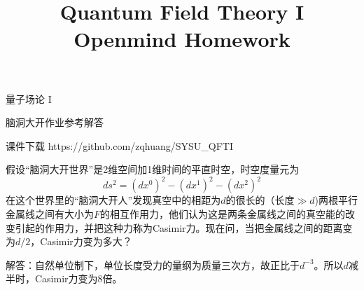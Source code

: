 \documentclass[CJK]{beamer}
\title{Quantum Field Theory I \\ Openmind Homework}
\author{}
\date{}
\begin{document}
\begin{frame}
 
\begin{center}
\begin{Large}
\bch
量子场论 I 

{\vskip 0.3in}

脑洞大开作业参考解答

\ech
\end{Large}
\end{center}

\vskip 0.2in

\bch
课件下载
\ech
https://github.com/zqhuang/SYSU\_QFTI

\end{frame}


\begin{frame}
\bch
\small{假设“脑洞大开世界”是2维空间加1维时间的平直时空，时空度量元为
$$ds^2 = (dx^0)^2 - (dx^1)^2-(dx^2)^2$$
在这个世界里的“脑洞大开人”发现真空中的相距为$d$的很长的（长度$\gg d$)两根平行金属线之间有大小为$F$的相互作用力，他们认为这是两条金属线之间的真空能的改变引起的作用力，并把这种力称为Casimir力。现在问，当把金属线之间的距离变为$d/2$，Casimir力变为多大？}

\skipline

解答：自然单位制下，单位长度受力的量纲为质量三次方，故正比于$d^{-3}$。所以$d$减半时，Casimir力变为8倍。

\ech
\end{frame}
\end{document}
